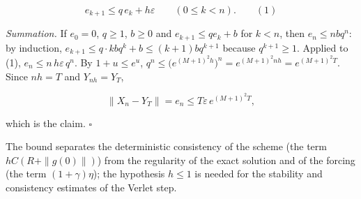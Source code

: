 \documentclass[11pt,a4paper]{article}
\begin{document}
\[e_{k+1}\le q\,e_k+h\varepsilon\qquad(0\le k<n).\qquad(1)\]


\emph{Summation.} If \(e_0=0\), \(q\ge1\), \(b\ge0\) and \(e_{k+1}\le qe_k+b\) for \(k<n\), then \(e_n\le nbq^n\): by induction, \(e_{k+1}\le q\cdot kbq^k+b\le(k+1)bq^{k+1}\) because \(q^{k+1}\ge1\). Applied to (1), \(e_n\le n\,h\varepsilon\,q^n\). By \(1+u\le e^u\), \(q^n\le\bigl(e^{(M+1)^2h}\bigr)^n=e^{(M+1)^2nh}=e^{(M+1)^2T}\). Since \(nh=T\) and \(Y_{nh}=Y_T\),


\[\|X_n-Y_T\|=e_n\le T\varepsilon\,e^{(M+1)^2T},\]


which is the claim. \(\square\)




The bound separates the deterministic consistency of the scheme (the term \(hC(R+\|g(0)\|)\)) from the regularity of the exact solution and of the forcing (the term \((1+\gamma)\eta\)); the hypothesis \(h\le1\) is needed for the stability and consistency estimates of the Verlet step.
\end{document}
